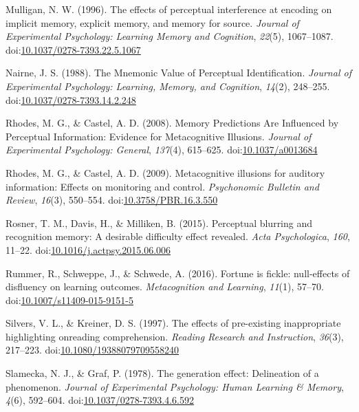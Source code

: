 \documentclass[jou]{apa6}
\begin{document}
\leavevmode\hypertarget{ref-Mulligan1996}{}%
Mulligan, N. W. (1996). The effects of perceptual interference at encoding on implicit memory, explicit memory, and memory for source. \emph{Journal of Experimental Psychology: Learning Memory and Cognition}, \emph{22}(5), 1067--1087. doi:\href{https://doi.org/10.1037/0278-7393.22.5.1067}{10.1037/0278-7393.22.5.1067}

\leavevmode\hypertarget{ref-Nairne1988}{}%
Nairne, J. S. (1988). The Mnemonic Value of Perceptual Identification. \emph{Journal of Experimental Psychology: Learning, Memory, and Cognition}, \emph{14}(2), 248--255. doi:\href{https://doi.org/10.1037/0278-7393.14.2.248}{10.1037/0278-7393.14.2.248}

\leavevmode\hypertarget{ref-Rhodes2008}{}%
Rhodes, M. G., \& Castel, A. D. (2008). Memory Predictions Are Influenced by Perceptual Information: Evidence for Metacognitive Illusions. \emph{Journal of Experimental Psychology: General}, \emph{137}(4), 615--625. doi:\href{https://doi.org/10.1037/a0013684}{10.1037/a0013684}

\leavevmode\hypertarget{ref-Rhodes2009}{}%
Rhodes, M. G., \& Castel, A. D. (2009). Metacognitive illusions for auditory information: Effects on monitoring and control. \emph{Psychonomic Bulletin and Review}, \emph{16}(3), 550--554. doi:\href{https://doi.org/10.3758/PBR.16.3.550}{10.3758/PBR.16.3.550}

\leavevmode\hypertarget{ref-Rosner2015}{}%
Rosner, T. M., Davis, H., \& Milliken, B. (2015). Perceptual blurring and recognition memory: A desirable difficulty effect revealed. \emph{Acta Psychologica}, \emph{160}, 11--22. doi:\href{https://doi.org/10.1016/j.actpsy.2015.06.006}{10.1016/j.actpsy.2015.06.006}

\leavevmode\hypertarget{ref-Rummer2016}{}%
Rummer, R., Schweppe, J., \& Schwede, A. (2016). Fortune is fickle: null-effects of disfluency on learning outcomes. \emph{Metacognition and Learning}, \emph{11}(1), 57--70. doi:\href{https://doi.org/10.1007/s11409-015-9151-5}{10.1007/s11409-015-9151-5}

\leavevmode\hypertarget{ref-Silvers1997}{}%
Silvers, V. L., \& Kreiner, D. S. (1997). The effects of pre-existing inappropriate highlighting onreading comprehension. \emph{Reading Research and Instruction}, \emph{36}(3), 217--223. doi:\href{https://doi.org/10.1080/19388079709558240}{10.1080/19388079709558240}

\leavevmode\hypertarget{ref-Slamecka1978}{}%
Slamecka, N. J., \& Graf, P. (1978). The generation effect: Delineation of a phenomenon. \emph{Journal of Experimental Psychology: Human Learning \& Memory}, \emph{4}(6), 592--604. doi:\href{https://doi.org/10.1037/0278-7393.4.6.592}{10.1037/0278-7393.4.6.592}
\end{document}
